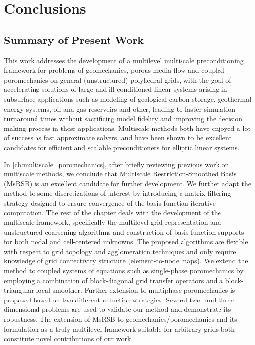 \chapter{Conclusions}
\label{ch:conclusions}

\section{Summary of Present Work}

This work addresses the development of a multilevel multiscale preconditioning framework for problems of geomechanics, porous media flow and coupled poromechanics on general (unstructured) polyhedral grids, with the goal of accelerating solutions of large and ill-conditioned linear systems arising in subsurface applications such as modeling of geological carbon storage, geothermal energy systems, oil and gas reservoirs and other, leading to faster simulation turnaround times without sacrificing model fidelity and improving the decision making process in these applications.   Multiscale methods both have enjoyed a lot of success as fast approximate solvers, and have been shown to be excellent candidates for efficient and scalable preconditioners for elliptic linear systems.

In \cref{ch:multiscale_poromechanics}, after briefly reviewing previous work on multiscale methods, we conclude that Multiscale Restriction-Smoothed Basis (MsRSB) is an excellent candidate for further development.   We further adapt the method to some discretizations of interest by introducing a matrix filtering strategy designed to ensure convergence of the basis function iterative computation.   The rest of the chapter deals with the development of the multiscale framework, specifically the multilevel grid representation and unstructured coarsening algorithms and construction of basis function supports for both nodal and cell-centered unknowns.  The proposed algorithms are flexible with respect to grid topology and agglomeration techniques and only require knowledge of grid connectivity structure (element-to-node maps).   We extend the method to coupled systems of equations such as single-phase poromechanics by employing a combination of block-diagonal grid transfer operators and a block-triangular local smoother.   Further extension to multiphase poromechanics is proposed based on two different reduction strategies.   Several two- and three-dimensional problems are used to validate our method and demonstrate its robustness.   The extension of MsRSB to geomechanics/poromechanics and its formulation as a truly multilevel framework suitable for arbitrary grids both constitute novel contributions of our work.

